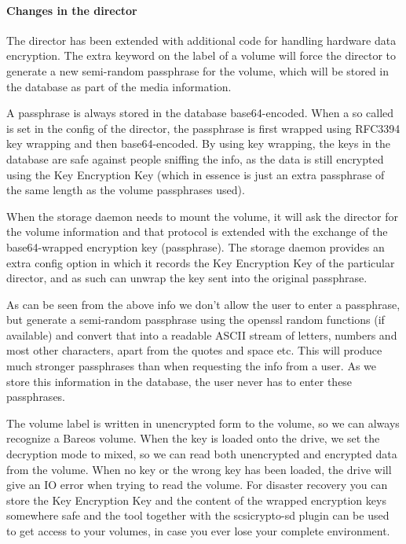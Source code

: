 \paragraph{Changes in the director}

The director has been extended with additional code for handling hardware data encryption. The extra keyword  on the label of a volume will force the director to generate a new semi-random passphrase for the volume, which will be stored in the database as part of the media information.

A passphrase is always stored in the database base64-encoded. When a so called  is set in the config of the director, the passphrase is first wrapped using RFC3394 key wrapping and then base64-encoded. By using key wrapping, the keys in the database are safe against people sniffing the info, as the data is still encrypted using the Key Encryption Key (which in essence is just an extra passphrase of the same length as the volume passphrases used).

When the storage daemon needs to mount the volume, it will ask the director for the volume information and that protocol is extended with the exchange of the base64-wrapped encryption key (passphrase). The storage daemon provides an extra config option in which it records the Key Encryption Key of the particular director, and as such can unwrap the key sent into the original passphrase.

As can be seen from the above info we don't allow the user to enter a passphrase, but generate a semi-random passphrase using the openssl random functions (if available) and convert that into a readable ASCII stream of letters, numbers and most other characters, apart from the quotes and space etc. This will produce much stronger passphrases than when requesting the info from a user. As we store this information in the database, the user never has to enter these passphrases.

The volume label is written in unencrypted form to the volume, so we can always recognize a Bareos volume. When the key is loaded onto the drive, we set the decryption mode to mixed, so we can read both unencrypted and encrypted data from the volume. When no key or the wrong key has been loaded, the drive will give an IO error when trying to read the volume.
For disaster recovery you can store the Key Encryption Key and the content of the wrapped encryption keys somewhere safe and the  tool together with the scsicrypto-sd plugin can be used to get access to your volumes, in case you ever lose your complete environment.


